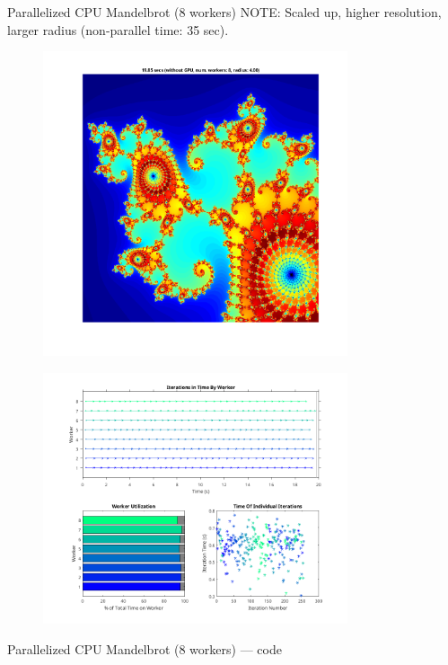 \documentclass[pdflatex,colorlinks,landscape]{beamer}
\begin{document}
\begin{frame}[allowframebreaks]{Parallelized CPU Mandelbrot (8 workers)}
  NOTE: Scaled up, higher resolution, larger radius (non-parallel time: 35 sec).
  \begin{figure}[H]
    \includegraphics[width=0.8\textwidth]{ParallelMandelbrot.png}
  \end{figure}
  \begin{figure}
    \includegraphics[width=0.8\textwidth]{ParallelMetrics.png}
  \end{figure}
\end{frame}

\begin{frame}[allowframebreaks]{Parallelized CPU Mandelbrot (8 workers) --- code}
  \begin{tiny}
    
  \end{tiny}
  \begin{tiny}
    
  \end{tiny}
\end{frame}
\end{document}
